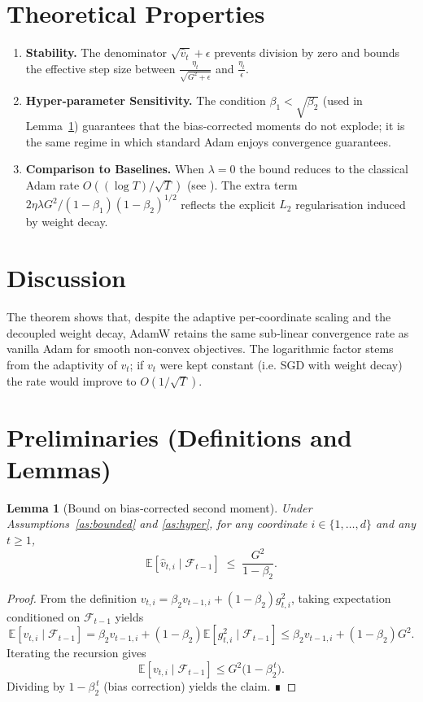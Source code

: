 \documentclass{article}
\newtheorem{lemma}{Lemma}
\newcommand{\EE}{\mathbb{E}}
\begin{document}
\section*{Theoretical Properties}
\begin{enumerate}[noitemsep]
    \item \textbf{Stability.} The denominator $\sqrt{\hat v_t}+\epsilon$ prevents division by zero and bounds the effective step size between
    $\displaystyle\frac{\eta_t}{\sqrt{G^2+\epsilon}}$ and $\displaystyle\frac{\eta_t}{\epsilon}$.
    \item \textbf{Hyper‑parameter Sensitivity.}
    The condition $\beta_1<\sqrt{\beta_2}$ (used in Lemma~\ref{lem:moment}) guarantees that the bias‑corrected moments do not explode; it is the same regime in which standard Adam enjoys convergence guarantees.
    \item \textbf{Comparison to Baselines.}
    When $\lambda=0$ the bound reduces to the classical Adam rate
    $O((\log T)/\sqrt{T})$ (see \cite{Reddi2018}).  The extra term
    $2\eta\lambda G^2/(1-\beta_1)(1-\beta_2)^{1/2}$ reflects the
    explicit $L_2$ regularisation induced by weight decay.
\end{enumerate}

\section*{Discussion}
The theorem shows that, despite the adaptive per‑coordinate scaling and the decoupled weight decay, AdamW retains the same sub‑linear convergence rate as vanilla Adam for smooth non‑convex objectives. The logarithmic factor stems from the adaptivity of $v_t$; if $v_t$ were kept constant (i.e. SGD with weight decay) the rate would improve to $O(1/\sqrt{T})$.

\newpage
\section*{Preliminaries (Definitions and Lemmas)}
\begin{lemma}[Bound on bias‑corrected second moment]\label{lem:moment}
Under Assumptions~\ref{as:bounded} and \ref{as:hyper},
for any coordinate $i\in\{1,\dots,d\}$ and any $t\ge1$,
\[
\EE\!\left[\hat v_{t,i}\mid\mathcal{F}_{t-1}\right]
\;\le\;
\frac{G^2}{1-\beta_2}.
\]
\end{lemma}
\begin{proof}
From the definition $v_{t,i}= \beta_2 v_{t-1,i} + (1-\beta_2) g_{t,i}^2$,
taking expectation conditioned on $\mathcal{F}_{t-1}$ yields
\[
\EE[v_{t,i}\mid\mathcal{F}_{t-1}]
 = \beta_2 v_{t-1,i} + (1-\beta_2)\EE[g_{t,i}^2\mid\mathcal{F}_{t-1}]
 \le \beta_2 v_{t-1,i} + (1-\beta_2)G^2 .
\]
Iterating the recursion gives
\[
\EE[v_{t,i}\mid\mathcal{F}_{t-1}]
 \le G^2\bigl(1-\beta_2^{\,t}\bigr).
\]
Dividing by $1-\beta_2^{\,t}$ (bias correction) yields the claim. ∎
\end{proof}
\end{document}

